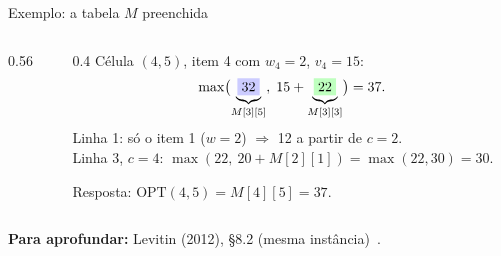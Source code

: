 \documentclass[aspectratio=169,xcolor=table]{beamer}
\newcommand{\marca}[3]{\fill[#3] ({#2*0.75-0.375},{-#1*0.5-0.25}) rectangle +(0.75,0.5);}
\newcommand{\gradeMochila}[1]{%
  \foreach \c in {0,...,5}
    \node[font=\tiny\bfseries, gray!60!black] at ({\c*0.75},0.45) {$c{=}\c$};
  \foreach \r/\rot in {0/{$i{=}0$}, 1/{$1\;(2,12)$}, 2/{$2\;(1,10)$}, 3/{$3\;(3,20)$},
                       4/{$4\;(2,15)$}}
    \node[font=\tiny, anchor=east] at (-0.42,{-\r*0.5}) {\rot};
  \foreach \lin [count=\i from 0] in #1
    \foreach \x [count=\c from 0] in \lin
      \node[cel] at ({\c*0.75},{-\i*0.5}) {\x};%
}
\newcommand{\valoresM}{{0,0,0,0,0,0},{0,0,12,12,12,12},{0,10,12,22,22,22},%
  {0,10,12,22,30,32},{0,10,15,25,30,37}}
\newcommand{\fonte}[1]{%
  \vfill
  {\tiny\color{gray!55!black}\textbf{Para aprofundar:} #1\par}%
}
\begin{document}
\begin{frame}{Exemplo: a tabela $M$ preenchida}
  \begin{columns}[c]
    \begin{column}{0.56\textwidth}
      \centering
    \end{column}
    \begin{column}{0.4\textwidth}
      \scriptsize Célula \colorbox{orange!40}{$(4,5)$}, item 4 com $w_4=2$, $v_4=15$:
      \[
        \max\bigl(\underbrace{\colorbox{blue!20}{$32$}}_{M[3][5]},\;
          15 + \underbrace{\colorbox{green!25}{$22$}}_{M[3][3]}\bigr) = 37.
      \]
      Linha 1: só o item 1 ($w=2$) $\Rightarrow$ 12 a partir de $c=2$.\\[2pt]
      Linha 3, $c=4$: $\max(22,\ 20 + M[2][1]) = \max(22, 30) = 30$.
      \medskip

      Resposta: $\mathrm{OPT}(4,5) = M[4][5] = 37$.
    \end{column}
  \end{columns}
  \fonte{Levitin (2012), \S 8.2 (mesma instância)~\cite{levitin2012introduction}.}
\end{frame}
\end{document}
